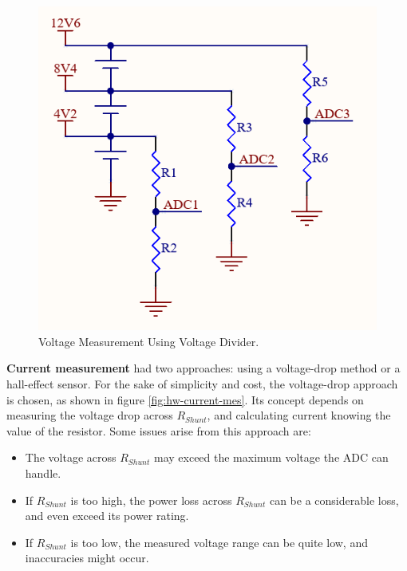 \begin{figure}[h!]
    \centering
    \includegraphics[scale=0.65]{./Figures/HW/Voltage-Measurement.png}
    \caption{Voltage Measurement Using Voltage Divider.}
    \label{fig:hw-volt-mes}
\end{figure}

 
\newpage




\textbf{Current measurement} had two approaches: using a voltage-drop method or a hall-effect sensor. For the sake of simplicity and cost, the voltage-drop approach is chosen, as shown in figure \ref{fig:hw-current-mes}. Its concept depends on measuring the voltage drop across \textbf{$R_{Shunt}$}, and calculating current knowing the value of the resistor. Some issues arise from this approach are:
\begin{itemize}
    \item The voltage across \textbf{$R_{Shunt}$} may exceed the maximum voltage the ADC can handle.
    \item If \textbf{$R_{Shunt}$} is too high, the power loss across \textbf{$R_{Shunt}$} can be a considerable loss, and even exceed its power rating.
    \item If \textbf{$R_{Shunt}$} is too low, the measured voltage range can be quite low, and inaccuracies might occur.
\end{itemize}



